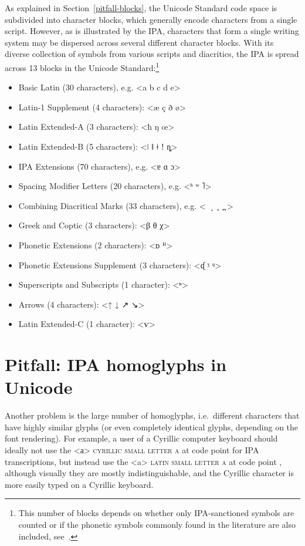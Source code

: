 As explained in Section~\ref{pitfall-blocks}, the Unicode Standard code space is
subdivided into character blocks, which generally encode characters from a
single script. However, as is illustrated by the IPA, characters that form a
single writing system may be dispersed across several different character
blocks. With its diverse collection of symbols from various scripts and
diacritics, the IPA is spread across 13 blocks in the Unicode
Standard:\footnote{This number of blocks depends on whether only IPA-sanctioned
symbols are counted or if the phonetic symbols commonly found in the literature
are also included, see~\cite[Appendix~C]{Moran2012}.}

\begin{itemize}
	\item Basic Latin (30 characters), e.g. <a b c d e> 
	\item Latin-1 Supplement (4 characters): <æ ç ð ø> 
	\item Latin Extended-A (3 characters): <ħ ŋ œ> 
	\item Latin Extended-B (5 characters): <ǀ ǁ ǂ ǃ ȵ> 
	\item IPA Extensions (70 characters), e.g. <ɐ ɑ ɔ> 
	\item Spacing Modifier Letters (20 characters), e.g. <ʰ ʷ ˥> 
	\item Combining Diacritical Marks (33 characters), e.g. <{\large \ \ ̝\ \ ̥\ \ ̪ }> 
	\item Greek and Coptic (3 characters): <β θ χ> 
	\item Phonetic Extensions (2 characters): <{\small {}ᴅ ᴴ}> 
	\item Phonetic Extensions Supplement (3 characters): <{\small {}ᶑ ᶾ ᶣ}> 
	\item Superscripts and Subscripts (1 character): <ⁿ> 
	\item Arrows (4 characters): <↑ ↓ ↗ ↘>
	\item Latin Extended-C (1 character): <{\small {}ⱱ}> 
\end{itemize}

\section{Pitfall: IPA homoglyphs in Unicode}
\label{pitfall-ipa-homoglyphs}

Another problem is the large number of homoglyphs, i.e.~different characters
that have highly similar glyphs (or even completely identical glyphs, depending
on the font rendering). For example, a user of a Cyrillic computer keyboard
should ideally not use the <а> \textsc{cyrillic small letter a} at code point
 for IPA transcriptions, but instead use the <a> \textsc{latin small
letter a} at code point , although visually they are mostly
indistinguishable, and the Cyrillic character is more easily typed on a Cyrillic
keyboard. 

